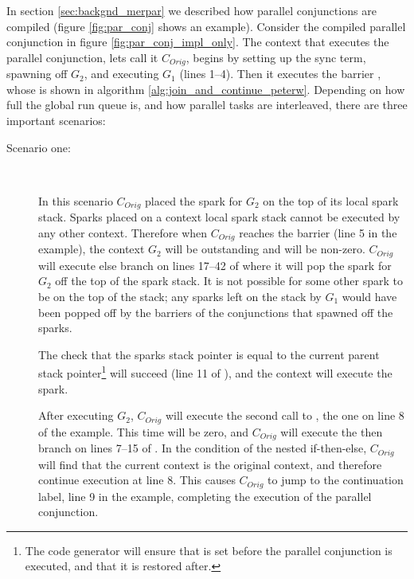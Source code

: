 In section \ref{sec:backgnd_merpar} we described how parallel
conjunctions are compiled
(figure \ref{fig:par_conj} shows an example).
Consider the compiled parallel conjunction in figure
\ref{fig:par_conj_impl_only}.
The context that executes the parallel conjunction,
lets call it $C_{Orig}$,
begins by
setting up the sync term,
spawning off $G_2$,
and executing $G_1$ (lines 1--4).
Then it executes the barrier \joinandcontinue,
whose is shown in
algorithm \ref{alg:join_and_continue_peterw}.
Depending on how full the global run queue is,
and how parallel tasks are interleaved,
there are three important scenarios:

\begin{description}

    \item[Scenario one:]~

    In this scenario $C_{Orig}$ placed the spark for $G_2$ on the top of its
    local spark stack.
    Sparks placed on a context local spark stack cannot be executed by any
    other context.
    Therefore when $C_{Orig}$ reaches the \joinandcontinue barrier
    (line 5 in the example),
    the context $G_2$ will be outstanding and
     will be non-zero.
    $C_{Orig}$ will execute else branch on lines 17--42 of \joinandcontinue
    where it will pop the spark for $G_2$ off the top of the spark stack.
    It is not possible for some other spark to be on the top of the stack;
    any sparks left on the stack by $G_1$ would have been popped off by
    the \joinandcontinue barriers of the conjunctions that spawned off the
    sparks.

    The check that the sparks stack pointer is equal to the current
    parent stack pointer\footnote{
        The code generator will ensure that  is set
        before the parallel conjunction is executed,
        and that it is restored after.}
    will succeed (line 11 of \joinandcontinue),
    and the context will execute the spark.

    After executing $G_2$,
    $C_{Orig}$ will execute the second call to \joinandcontinue,
    the one on line 8 of the example.
    This time  will be zero,
    and $C_{Orig}$ will execute the then branch on lines 7--15 of
    \joinandcontinue.
    In the condition of the nested if-then-else,
    $C_{Orig}$ will find that the current context is the original context,
    and therefore continue execution at line 8.
    This causes $C_{Orig}$ to jump to the continuation label,
    line 9 in the example,
    completing the execution of the parallel conjunction.


\end{description}
